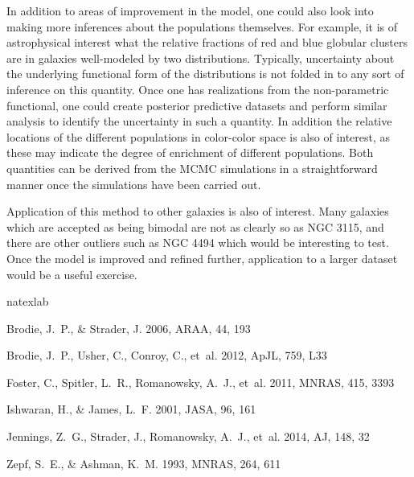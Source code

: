 \documentclass{article}
\begin{document}
In addition to areas of improvement in the model, one could also look into making more inferences about the populations
themselves. For example, it is of astrophysical interest what the relative fractions of red and blue globular clusters are
in galaxies well-modeled by two distributions. Typically, uncertainty about the underlying functional
form of the distributions is not folded in to any sort of inference on this quantity. Once one has realizations from
the non-parametric functional, one could create posterior predictive datasets and perform similar analysis to
identify the uncertainty in such a quantity. In addition the relative locations of the different populations in color-color
space is also of interest, as these may indicate the degree of enrichment of different populations. Both quantities
can be derived from the MCMC simulations in a straightforward manner once the simulations have been carried out.

Application of this method to other galaxies is also of interest. Many galaxies which are accepted as being
bimodal are not as clearly so as NGC 3115, and there are other outliers such as NGC 4494 which would be interesting
to test. Once the model is improved and refined further, application to a larger dataset would be a useful exercise.
%
%

\begin{thebibliography}{}
\expandafter\ifx\csname natexlab\endcsname\relax\def\natexlab#1{#1}\fi

{Brodie}, J.~P., \& {Strader}, J. 2006, ARAA, 44, 193

{Brodie}, J.~P., {Usher}, C., {Conroy}, C., {et~al.} 2012, ApJL, 759, L33

{Foster}, C., {Spitler}, L.~R., {Romanowsky}, A.~J., {et~al.} 2011, MNRAS,
  415, 3393

Ishwaran, H., \& James, L.~F. 2001, JASA, 96, 161

{Jennings}, Z.~G., {Strader}, J., {Romanowsky}, A.~J., {et~al.} 2014, AJ, 148,
  32

{Zepf}, S.~E., \& {Ashman}, K.~M. 1993, MNRAS, 264, 611

\end{thebibliography}
\end{document}
